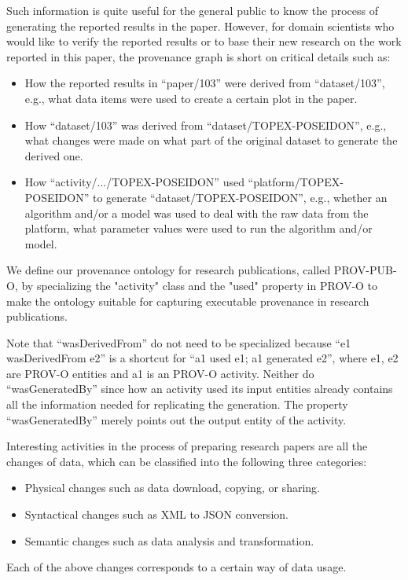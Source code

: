 Such information is quite useful for the general public to know the process of generating the reported results in the paper. However, for domain scientists who would like to verify the reported results or to base their new research on the work reported in this paper, the provenance graph is short on critical details such as:
\begin{itemize}
	\item How the reported results in ``paper/103'' were derived from ``dataset/103'', e.g., what data items were used to create a certain plot in the paper.
	\item How ``dataset/103'' was derived from ``dataset/TOPEX-POSEIDON'', e.g., what changes were made on what part of the original dataset to generate the derived one.
	\item How ``activity/.../TOPEX-POSEIDON'' used ``platform/TOPEX-POSEIDON'' to generate ``dataset/TOPEX-POSEIDON'', e.g., whether an algorithm and/or a model was used to deal with the raw data from the platform, what parameter values were used to run the algorithm and/or model.
\end{itemize} 
We define our provenance ontology for research publications, called PROV-PUB-O, by specializing the "activity" class and the "used" property in PROV-O to make the ontology suitable for capturing executable provenance in research publications.

Note that ``wasDerivedFrom'' do not need to be specialized because ``e1 wasDerivedFrom e2'' is a shortcut for ``a1 used e1; a1 generated e2'', where e1, e2 are PROV-O entities and a1 is an PROV-O activity. Neither do ``wasGeneratedBy'' since how an activity used its input entities already contains all the information needed for replicating the generation. The property ``wasGeneratedBy'' merely points out the output entity of the activity.

Interesting activities in the process of preparing research papers are all the changes of data, which can be classified into the following three categories:
\begin{itemize}
	\item Physical changes such as data download, copying, or sharing.
	\item Syntactical changes such as XML to JSON conversion.
	\item Semantic changes such as data analysis and transformation.
\end{itemize}
Each of the above changes corresponds to a certain way of data usage.

